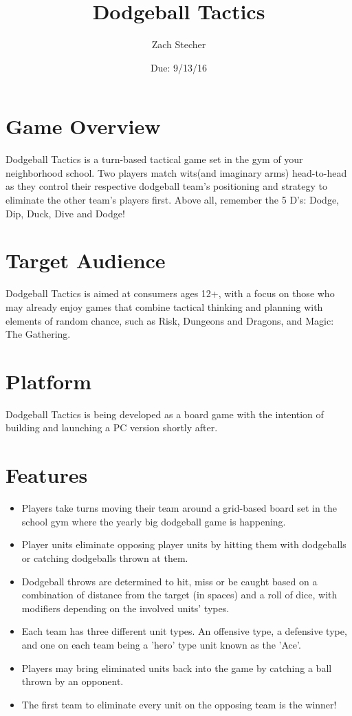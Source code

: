 \documentclass[11pt] {article}
\title{Dodgeball Tactics}
\author{Zach Stecher}
\date{Due: 9/13/16}
\begin{document}
\maketitle

\section*{Game Overview}
Dodgeball Tactics is a turn-based tactical game set in the gym of your neighborhood school. Two players match wits(and imaginary arms) head-to-head as they control their respective dodgeball team's positioning and strategy to eliminate the other team's players first. Above all, remember the 5 D's: Dodge, Dip, Duck, Dive and Dodge!

\section*{Target Audience}
Dodgeball Tactics is aimed at consumers ages 12+, with a focus on those who may already enjoy games that combine tactical thinking and planning with elements of random chance, such as Risk, Dungeons and Dragons, and Magic: The Gathering.

\section*{Platform}
Dodgeball Tactics is being developed as a board game with the intention of building and launching a PC version shortly after.

\section*{Features}
\begin{itemize}
\item Players take turns moving their team around a grid-based board set in the school gym where the yearly big dodgeball game is happening.
\item Player units eliminate opposing player units by hitting them with dodgeballs or catching dodgeballs thrown at them.
\item Dodgeball throws are determined to hit, miss or be caught based on a combination of distance from the target (in spaces) and a roll of dice, with modifiers depending on the involved units' types.
\item Each team has three different unit types. An offensive type, a defensive type, and one on each team being a 'hero' type unit known as the 'Ace'.
\item Players may bring eliminated units back into the game by catching a ball thrown by an opponent.
\item The first team to eliminate every unit on the opposing team is the winner!
\end{itemize}
\end{document}

